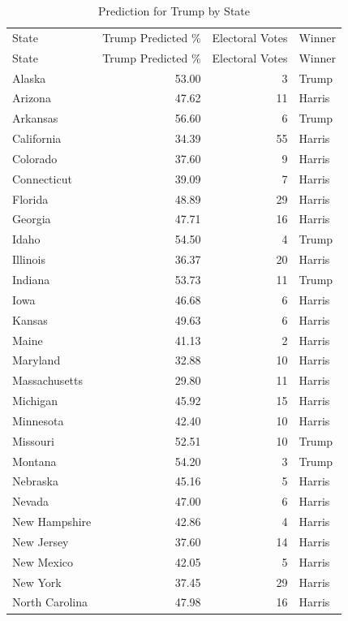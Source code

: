 \documentclass[
  letterpaper,
  DIV=11,
  numbers=noendperiod]{scrartcl}
\begin{document}
\begin{longtable}[]{@{}lrrl@{}}

\caption{\label{tbl-prediction}Prediction for Trump}

\tabularnewline

\caption{Prediction for Trump by State}\tabularnewline
\toprule\noalign{}
State & Trump Predicted \% & Electoral Votes & Winner \\
\midrule\noalign{}
\endfirsthead
\toprule\noalign{}
State & Trump Predicted \% & Electoral Votes & Winner \\
\midrule\noalign{}
\endhead
\bottomrule\noalign{}
\endlastfoot
Alaska & 53.00 & 3 & Trump \\
Arizona & 47.62 & 11 & Harris \\
Arkansas & 56.60 & 6 & Trump \\
California & 34.39 & 55 & Harris \\
Colorado & 37.60 & 9 & Harris \\
Connecticut & 39.09 & 7 & Harris \\
Florida & 48.89 & 29 & Harris \\
Georgia & 47.71 & 16 & Harris \\
Idaho & 54.50 & 4 & Trump \\
Illinois & 36.37 & 20 & Harris \\
Indiana & 53.73 & 11 & Trump \\
Iowa & 46.68 & 6 & Harris \\
Kansas & 49.63 & 6 & Harris \\
Maine & 41.13 & 2 & Harris \\
Maryland & 32.88 & 10 & Harris \\
Massachusetts & 29.80 & 11 & Harris \\
Michigan & 45.92 & 15 & Harris \\
Minnesota & 42.40 & 10 & Harris \\
Missouri & 52.51 & 10 & Trump \\
Montana & 54.20 & 3 & Trump \\
Nebraska & 45.16 & 5 & Harris \\
Nevada & 47.00 & 6 & Harris \\
New Hampshire & 42.86 & 4 & Harris \\
New Jersey & 37.60 & 14 & Harris \\
New Mexico & 42.05 & 5 & Harris \\
New York & 37.45 & 29 & Harris \\
North Carolina & 47.98 & 16 & Harris \\

\end{longtable}
\end{document}

